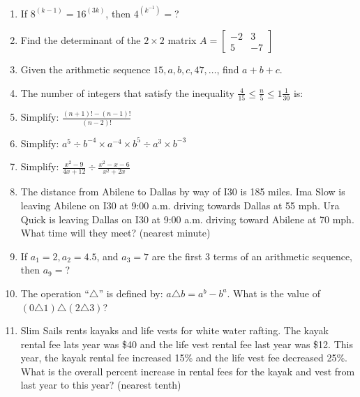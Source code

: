 \documentclass[../uilmath.tex]{subfiles}
\begin{document}
\begin{enumerate}[label=\bfseries\arabic*.]
        \item %
        If $8^{(k-1)}=16^{(3k)}$, then $4^{(k^{-1})}=$?

        \item %
        Find the determinant of the $2\times 2$ matrix 
        $A = \begin{bmatrix}
            -2 & 3\\
            5 & -7
            \end{bmatrix}$

        \item %
        Given the arithmetic sequence $15,a,b,c,47,\dots$, find $a+b+c$.

        \item %
        The number of integers that satisfy the inequality $\frac{4}{15}\leq \frac{n}{5} \leq 1\frac{1}{30}$ is: 

        \item %
        Simplify: $\frac{(n+1)!-(n-1)!}{(n-2)!}$

        \item %
        Simplify: $a^5 \div b^{-4} \times a^{-4} \times b^5 \div a^3 \times b^{-3}$

        \item %
        Simplify: $\frac{x^2-9}{4x+12}\div \frac{x^2-x-6}{x^2+2x}$

        \item %
        The distance from Abilene to Dallas by way of I30 is 185 miles. Ima Slow is leaving Abilene on I30 at 9:00 a.m. driving towards Dallas at 55 mph.
        Ura Quick is leaving Dallas on I30 at 9:00 a.m. driving toward Abilene at 70 mph. What time will they meet? (nearest minute)

        \item %
        If $a_1=2,a_2=4.5$, and $a_3=7$ are the first 3 terms of an arithmetic sequence, then $a_9=$?

        \item %
        The operation ``$\triangle$'' is defined by: $a\triangle b = a^b-b^a$. What is the value of $(0\triangle 1)\triangle(2\triangle 3)$?

        \item %
        Slim Sails rents kayaks and life vests for white water rafting. The kayak rental fee lats year was \$40 and the life vest rental fee last year was \$12.
        This year, the kayak rental fee increased 15\% and the life vest fee decreased 25\%. What is the overall percent increase in rental fees for the kayak and vest 
        from last year to this year? (nearest tenth)


\end{enumerate}
\end{document}
